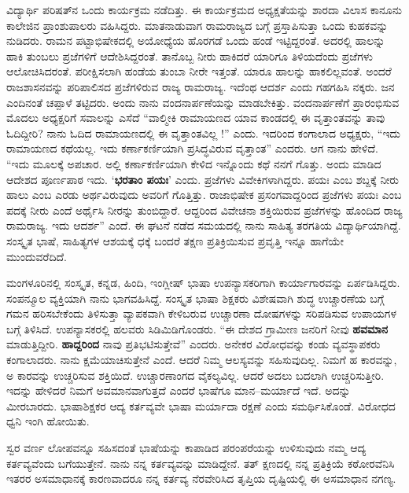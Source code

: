 {ವಿದ್ಯಾರ್ಥಿ ಪರಿಷತ್‍ನ ಒಂದು ಕಾರ್ಯಕ್ರಮ ನಡೆದಿತ್ತು.  ಈ ಕಾರ್ಯಕ್ರಮದ ಅಧ್ಯಕ್ಷತೆಯನ್ನು ಶಾರದಾ ವಿಲಾಸ ಕಾನೂನು ಕಾಲೇಜಿನ ಪ್ರಾಂಶುಪಾಲರು ವಹಿಸಿದ್ದರು.  ಮಾತನಾಡುವಾಗ ರಾಮರಾಜ್ಯದ ಬಗ್ಗೆ ಪ್ರಸ್ತಾಪಿಸುತ್ತಾ ಒಂದು ಕುಹಕವನ್ನು ನುಡಿದರು.  ರಾಮನ ಪಟ್ಟಾಭಿಷೇಕದಲ್ಲಿ ಅಯೋಧ್ಯೆಯ ಹೊರಗಡೆ ಒಂದು ಹಂಡೆ ಇಟ್ಟಿದ್ದರಂತೆ.  ಅದರಲ್ಲಿ ಹಾಲನ್ನು ಹಾಕಿ ತುಂಬಲು ಪ್ರಜೆಗಳಿಗೆ ಆದೇಶಿಸಿದ್ದರಂತೆ.  ತಾನೊಬ್ಬ ನೀರು ಹಾಕಿದರೆ ಯಾರಿಗೂ ತಿಳಿಯದೆಂದು ಪ್ರಜೆಗಳು ಆಲೋಚಿಸಿದರಂತೆ. ಪರೀಕ್ಷಿಸಲಾಗಿ ಹಂಡೆಯ ತುಂಬಾ ನೀರೇ ಇತ್ತಂತೆ.  ಯಾರೂ ಹಾಲನ್ನು ಹಾಕಲಿಲ್ಲವಂತೆ.  ಅಂದರೆ ರಾಜಶಾಸನವನ್ನು ಪರಿಪಾಲಿಸದ ಪ್ರಜೆಗಳಿರುವ ರಾಜ್ಯ ರಾಮರಾಜ್ಯ.  ಇದೆಂಥ ಆದರ್ಶ ಎಂದು ಗಹಗಹಿಸಿ ನಕ್ಕರು.  ಜನ ಎಂದಿನಂತೆ ಚಪ್ಪಾಳೆ ತಟ್ಟಿದರು.  ಅಂದು ನಾನು ವಂದನಾರ್ಪಣೆಯನ್ನು ಮಾಡಬೇಕಿತ್ತು.  ವಂದನಾರ್ಪಣೆಗೆ ಪ್ರಾರಂಭಿಸುವ ಮೊದಲು ಅಧ್ಯಕ್ಷರಿಗೆ ಸವಾಲನ್ನು ಎಸೆದೆ  “ವಾಲ್ಮೀಕಿ ರಾಮಾಯಣದ ಯಾವ ಕಾಂಡದಲ್ಲಿ ಈ ವೃತ್ತಾಂತವನ್ನು ತಾವು ಓದಿದ್ದೀರಿ?  ನಾನು ಓದಿದ ರಾಮಾಯಣದಲ್ಲಿ ಈ ವೃತ್ತಾಂತವಿಲ್ಲ !” ಎಂದು.  ಇದರಿಂದ ಕಂಗಾಲಾದ ಅಧ್ಯಕ್ಷರು, “ಇದು ರಾಮಾಯಣದ ಕಥೆಯಲ್ಲ. ಇದು ಕರ್ಣಾಕರ್ಣಿಯಾಗಿ ಪ್ರಸಿದ್ಧವಿರುವ ವೃತ್ತಾಂತ” ಎಂದರು.  ಆಗ ನಾನು ಹೇಳಿದೆ.  “ಇದು ಮೂಲಕ್ಕೆ ಅಪಚಾರ.  ಅಲ್ಲಿ ಕರ್ಣಾಕರ್ಣಿಯಾಗಿ ಕೇಳಿದ ಇನ್ನೊಂದು ಕಥೆ ನನಗೆ ಗೊತ್ತು. ಅಂದು ಮಾಡಿದ ಆದೇಶದ ಪೂರ್ಣಪಾಠ ಇದು.  ‘\textbf{ಭರತಾಂ ಪಯಃ}’ ಎಂದು.  ಪ್ರಜೆಗಳು ವಿವೇಕಿಗಳಾಗಿದ್ದರು.  ಪಯಃ ಎಂಬ ಶಬ್ದಕ್ಕೆ ನೀರು ಹಾಲು ಎಂಬ ಎರಡು ಅರ್ಥವಿರುವುದು ಅವರಿಗೆ ಗೊತ್ತಿತ್ತು.  ರಾಜಾಭಿಷೇಕ ಪ್ರಸಂಗವಾದ್ದರಿಂದ ಪ್ರಜೆಗಳು ಪಯಃ ಎಂಬ ಪದಕ್ಕೆ ನೀರು ಎಂದೆ ಅರ್ಥೈಸಿ ನೀರನ್ನು ತುಂಬಿದ್ದಾರೆ. ಆದ್ದರಿಂದ ವಿವೇಚನಾ ಶಕ್ತಿಯಿರುವ ಪ್ರಜೆಗಳನ್ನು ಹೊಂದಿದ ರಾಜ್ಯ ರಾಮರಾಜ್ಯ.  ಇದು ಆದರ್ಶ” ಎಂದೆ.  ಈ ಘಟನೆ ನಡೆದ ಸಮಯದಲ್ಲಿ ನಾನು ಸಾಹಿತ್ಯ ತರಗತಿಯ ವಿದ್ಯಾರ್ಥಿಯಾಗಿದ್ದೆ.  ಸಂಸ್ಕೃತ ಭಾಷೆ, ಸಾಹಿತ್ಯಗಳ ಆಶಯಕ್ಕೆ ಧಕ್ಕೆ ಬಂದರೆ ತಕ್ಷಣ ಪ್ರತಿಕ್ರಿಯಿಸುವ ಪ್ರವೃತ್ತಿ ಇನ್ನೂ ಹಾಗೆಯೇ ಮುಂದುವರೆದಿದೆ.   

ಮಂಗಳೂರಿನಲ್ಲಿ ಸಂಸ್ಕೃತ, ಕನ್ನಡ, ಹಿಂದಿ, ಇಂಗ್ಲೀಷ್ ಭಾಷಾ ಉಪನ್ಯಾಸಕರಿಗಾಗಿ ಕಾರ್ಯಾಗಾರವನ್ನು ಏರ್ಪಡಿಸಿದ್ದರು.  ಸಂಪನ್ಮೂಲ ವ್ಯಕ್ತಿಯಾಗಿ ನಾನು ಭಾಗವಹಿಸಿದ್ದೆ.  ಸಂಸ್ಕೃತ ಭಾಷಾ ಶಿಕ್ಷಕರು ವಿಶೇಷವಾಗಿ ಶುದ್ಧ ಉಚ್ಚಾರಣೆಯ ಬಗ್ಗೆ ಗಮನ ಹರಿಸಬೇಕೆಂದು ತಿಳಿಸುತ್ತಾ ವ್ಯಾಪಕವಾಗಿ ಕೇಳಿಬರುವ ಉಚ್ಚಾರಣಾ ದೋಷಗಳನ್ನು ಸರಿಪಡಿಸುವ ಉಪಾಯಗಳ ಬಗ್ಗೆ ತಿಳಿಸಿದೆ.  ಉಪನ್ಯಾಸಕರಲ್ಲಿ ಹಲವರು ಸಿಡಿಮಿಡಿಗೊಂಡರು.  “ಈ ದೇಶದ ಗ್ರಾಮೀಣ ಜನರಿಗೆ ನೀವು \textbf{ಹವಮಾನ} ಮಾಡುತ್ತಿದ್ದೀರಿ.  \textbf{ಹಾದ್ದರಿಂದ} ನಾವು ಪ್ರತಿಭಟಿಸುತ್ತೇವೆ” ಎಂದರು.  ಅನೇಕರ ವಿರೋಧವನ್ನು ಕಂಡು ವ್ಯವಸ್ಥಾಪಕರು ಕಂಗಾಲಾದರು. ನಾನು ಕ್ಷಮೆಯಾಚಿಸುತ್ತೇನೆ  ಎಂದೆ.   ಆದರೆ ನಿಮ್ಮ ಆಲಸ್ಯವನ್ನು ಸಹಿಸುವುದಿಲ್ಲ.  ನಿಮಗೆ ಹ ಕಾರವನ್ನು, ಅ ಕಾರವನ್ನು ಉಚ್ಚರಿಸುವ ಶಕ್ತಿಯಿದೆ.  ಉಚ್ಚಾರಣಾಂಗದ ವೈಕಲ್ಯವಿಲ್ಲ.  ಆದರೆ ಅದಲು ಬದಲಾಗಿ ಉಚ್ಚರಿಸುತ್ತೀರಿ.  ಇದನ್ನು ಹೇಳಿದರೆ ನಿಮಗೆ ಅವಮಾನವಾಗುತ್ತದೆ ಎಂದರೆ ಭಾಷೆಗೂ ಮಾನ–ಮರ್ಯಾದೆ ಇದೆ.  ಅದನ್ನು ಮೀರಬಾರದು.  ಭಾಷಾಶಿಕ್ಷಕರ ಆದ್ಯ ಕರ್ತವ್ಯವೇ ಭಾಷಾ ಮರ್ಯಾದಾ ರಕ್ಷಣೆ ಎಂದು ಸಮರ್ಥಿಸಿಕೊಂಡೆ.  ವಿರೋಧದ ಧ್ವನಿ ಇಂಗಿ ಹೋಯಿತು. 

ಸ್ವರ ವರ್ಣ ಲೋಪವನ್ನೂ ಸಹಿಸದಂತೆ ಭಾಷೆಯನ್ನು ಕಾಪಾಡಿದ ಪರಂಪರೆಯನ್ನು ಉಳಿಸುವುದು ನಮ್ಮ ಆದ್ಯ ಕರ್ತವ್ಯವೆಂದು ಬಗೆಯುತ್ತೇನೆ.  ನಾನು ನನ್ನ ಕರ್ತವ್ಯವನ್ನು ಮಾಡಿದ್ದೇನೆ.  ತತ್ ಕ್ಷಣದಲ್ಲಿ ನನ್ನ ಪ್ರತಿಕ್ರಿಯೆ ಕಠೋರವೆನಿಸಿ ಇತರರ ಅಸಮಾಧಾನಕ್ಕೆ ಕಾರಣವಾದರೂ ನನ್ನ ಕರ್ತವ್ಯ ನೆರವೇರಿಸಿದ ತೃಪ್ತಿಯ ದೃಷ್ಟಿಯಲ್ಲಿ ಈ ಅಸಮಾಧಾನ ನಗಣ್ಯ.

}
